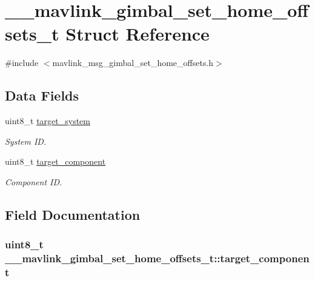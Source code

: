 \hypertarget{struct____mavlink__gimbal__set__home__offsets__t}{\section{\+\_\+\+\_\+mavlink\+\_\+gimbal\+\_\+set\+\_\+home\+\_\+offsets\+\_\+t Struct Reference}
\label{struct____mavlink__gimbal__set__home__offsets__t}
}


{\ttfamily \#include $<$mavlink\+\_\+msg\+\_\+gimbal\+\_\+set\+\_\+home\+\_\+offsets.\+h$>$}

\subsection*{Data Fields}
\begin{DoxyCompactItemize}
\item 
uint8\+\_\+t \hyperlink{struct____mavlink__gimbal__set__home__offsets__t_af34d0af5b9d3d20afaddeece2e3d799a}{target\+\_\+system}
\begin{DoxyCompactList}\small\item\em System I\+D. \end{DoxyCompactList}\item 
uint8\+\_\+t \hyperlink{struct____mavlink__gimbal__set__home__offsets__t_a093a52b645f0e3eae281c1dcff80a0c2}{target\+\_\+component}
\begin{DoxyCompactList}\small\item\em Component I\+D. \end{DoxyCompactList}\end{DoxyCompactItemize}


\subsection{Field Documentation}
\hypertarget{struct____mavlink__gimbal__set__home__offsets__t_a093a52b645f0e3eae281c1dcff80a0c2}{
\subsubsection[{target\+\_\+component}]{\setlength{\rightskip}{0pt plus 5cm}uint8\+\_\+t \+\_\+\+\_\+mavlink\+\_\+gimbal\+\_\+set\+\_\+home\+\_\+offsets\+\_\+t\+::target\+\_\+component}}\label{struct____mavlink__gimbal__set__home__offsets__t_a093a52b645f0e3eae281c1dcff80a0c2}


